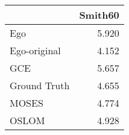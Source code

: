 \begin{tabular}{lr}
\toprule
{} & Smith60 \\
\midrule
Ego          &   5.920 \\
Ego-original &   4.152 \\
GCE          &   5.657 \\
Ground Truth &   4.655 \\
MOSES        &   4.774 \\
OSLOM        &   4.928 \\
\bottomrule
\end{tabular}
